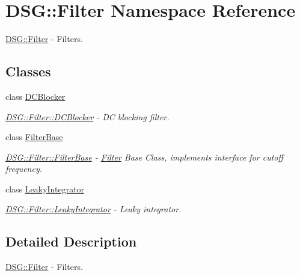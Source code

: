 \hypertarget{namespace_d_s_g_1_1_filter}{\section{D\+S\+G\+:\+:Filter Namespace Reference}
\label{namespace_d_s_g_1_1_filter}
}


\hyperlink{namespace_d_s_g_1_1_filter}{D\+S\+G\+::\+Filter} -\/ Filters.  


\subsection*{Classes}
\begin{DoxyCompactItemize}
\item 
class \hyperlink{class_d_s_g_1_1_filter_1_1_d_c_blocker}{D\+C\+Blocker}
\begin{DoxyCompactList}\small\item\em \hyperlink{class_d_s_g_1_1_filter_1_1_d_c_blocker}{D\+S\+G\+::\+Filter\+::\+D\+C\+Blocker} -\/ D\+C blocking filter. \end{DoxyCompactList}\item 
class \hyperlink{class_d_s_g_1_1_filter_1_1_filter_base}{Filter\+Base}
\begin{DoxyCompactList}\small\item\em \hyperlink{class_d_s_g_1_1_filter_1_1_filter_base}{D\+S\+G\+::\+Filter\+::\+Filter\+Base} -\/ \hyperlink{namespace_d_s_g_1_1_filter}{Filter} Base Class, implements interface for cutoff frequency. \end{DoxyCompactList}\item 
class \hyperlink{class_d_s_g_1_1_filter_1_1_leaky_integrator}{Leaky\+Integrator}
\begin{DoxyCompactList}\small\item\em \hyperlink{class_d_s_g_1_1_filter_1_1_leaky_integrator}{D\+S\+G\+::\+Filter\+::\+Leaky\+Integrator} -\/ Leaky integrator. \end{DoxyCompactList}\end{DoxyCompactItemize}


\subsection{Detailed Description}
\hyperlink{namespace_d_s_g_1_1_filter}{D\+S\+G\+::\+Filter} -\/ Filters. 